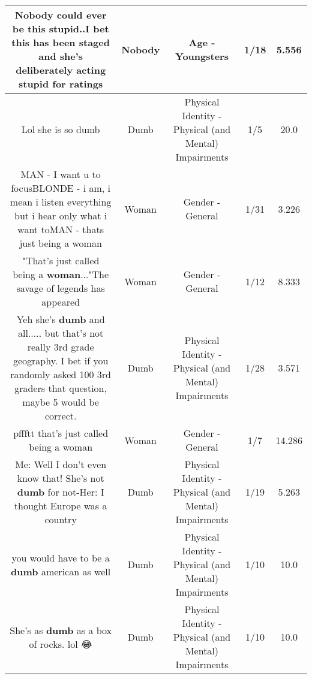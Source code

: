 \documentclass[11pt]{article}
\newlength\mylength
\begin{document}
\begin{center}
\begin{longtable}{|C{.65\mylength}|C{.30\mylength}|C{.12\mylength}|C{.12\mylength}|C{.12\mylength}|}
  \small Nobody could ever be this stupid..I bet this has been staged and she's deliberately acting stupid for ratings\normalsize   & Nobody & Age - Youngsters & 1/18 & 5.556 \\  \hline
  \small Lol she is so dumb\normalsize   & Dumb & Physical Identity - Physical (and Mental) Impairments & 1/5 & 20.0 \\  \hline
  \small MAN - I want u to focusBLONDE - i am, i mean i listen everything but i hear only what i want toMAN - thats just being a woman\normalsize   & Woman & Gender - General & 1/31 & 3.226 \\  \hline
  \small "That's just called being a \textbf{woman}..."The savage of legends has appeared\normalsize   & Woman & Gender - General & 1/12 & 8.333 \\  \hline
  \small Yeh she's \textbf{dumb} and all..... but that's not really 3rd grade geography.  I bet if you randomly asked 100 3rd graders that question, maybe 5 would be correct.\normalsize   & Dumb & Physical Identity - Physical (and Mental) Impairments & 1/28 & 3.571 \\  \hline
  \small pffftt that's just called being a woman\normalsize   & Woman & Gender - General & 1/7 & 14.286 \\  \hline
  \small Me: Well I don't even know that! She's not \textbf{dumb} for not-Her: I thought Europe was a country\normalsize   & Dumb & Physical Identity - Physical (and Mental) Impairments & 1/19 & 5.263 \\  \hline
  \small you would have to be a \textbf{dumb} american as well\normalsize   & Dumb & Physical Identity - Physical (and Mental) Impairments & 1/10 & 10.0 \\  \hline
  \small She's as \textbf{dumb} as a box of rocks. lol 😂\normalsize   & Dumb & Physical Identity - Physical (and Mental) Impairments & 1/10 & 10.0 \\  \hline

\end{longtable}
\end{center}
\end{document}
